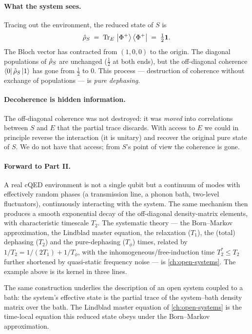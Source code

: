 \begin{example}
\paragraph{What the system sees.}
Tracing out the environment, the reduced state of $S$ is
\begin{equation}
\hat{\rho}_S \;=\; \operatorname{Tr}_E\,\ket{\Phi^+}\bra{\Phi^+}
              \;=\; \tfrac12 \mathbf{1}.
\end{equation}
The Bloch vector has contracted from $(1,0,0)$ to the origin. The
diagonal populations of $\hat{\rho}_S$ are unchanged ($\tfrac12$ at
both ends), but the off-diagonal coherence
$\bra{0}\hat{\rho}_S\ket{1}$ has gone from $\tfrac12$ to $0$. This
process --- destruction of coherence without exchange of populations
--- is \emph{pure dephasing}.

\paragraph{Decoherence is hidden information.}
The off-diagonal coherence was not destroyed: it was \emph{moved}
into correlations between $S$ and $E$ that the partial trace
discards. With access to $E$ we could in principle reverse the
interaction (it is unitary) and recover the original pure state of
$S$. We do not have that access; from $S$'s point of view the
coherence is gone.

\paragraph{Forward to Part II.}
A real cQED environment is not a single qubit but a continuum of
modes with effectively random phases (a transmission line, a phonon
bath, two-level fluctuators), continuously interacting with the
system. The same mechanism then produces a smooth exponential decay
of the off-diagonal density-matrix elements, with characteristic
timescale $T_2$. The systematic theory --- the Born--Markov
approximation, the Lindblad master equation, the relaxation
($T_1$), the (total) dephasing ($T_2$) and the pure-dephasing
($T_\phi$) times, related by $1/T_2 = 1/(2T_1) + 1/T_\phi$, with
the inhomogeneous/free-induction time $T_2^*\leq T_2$ further
shortened by quasi-static frequency noise --- is
\cref{ch:open-systems}. The example above is its kernel in three
lines.
\end{example}

\begin{remark}
The same construction underlies the description of an open system
coupled to a bath: the system's effective state is the partial trace
of the system--bath density matrix over the bath. The Lindblad
master equation of \cref{ch:open-systems} is the time-local equation
this reduced state obeys under the Born--Markov approximation.
\end{remark}

